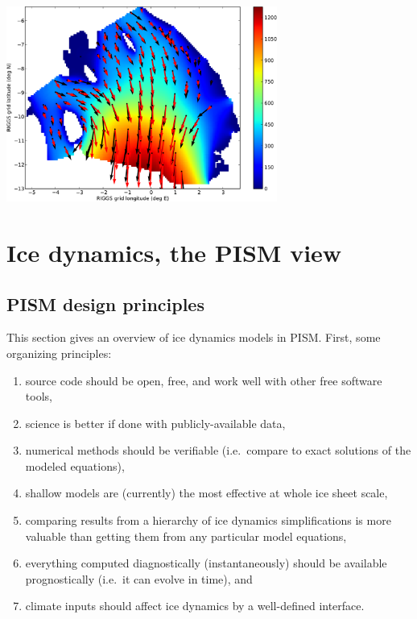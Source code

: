 \documentclass[titlepage,letterpaper,final]{scrartcl}
\begin{document}
\begin{center}
\includegraphics[width=3.5in,keepaspectratio=true]{rossquiver}
\end{center}

\vspace{.4in}

\large
\begin{center}
\normalsize
\end{center}
\normalsize


\clearpage\newpage



\clearpage
\newpage
\section{Ice dynamics, the PISM view}\label{sect:dynamics}

\subsection{PISM design principles}  This section gives an overview of ice dynamics models in PISM.  First, some organizing principles:
\begin{enumerate}
\item source code should be open, free, and work well with other free software tools,
\item science is better if done with publicly-available data,
\item numerical methods should be verifiable (i.e.~compare to exact solutions of the modeled equations),
\item shallow models are (currently) the most effective at whole ice sheet scale,
\item comparing results from a hierarchy of ice dynamics simplifications is more valuable than getting them from any particular model equations,
\item everything computed diagnostically (instantaneously) should be available prognostically (i.e.~it can evolve in time), and
\item climate inputs should affect ice dynamics by a well-defined interface.
\end{enumerate}
\end{document}
